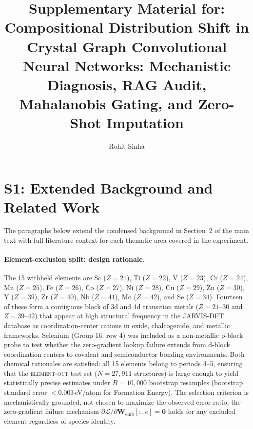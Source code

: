 \documentclass[preprint,12pt]{elsarticle}
\newcommand{\mae}{\text{MAE}}
\newcommand{\elout}{\textsc{element-out}}
\begin{document}
\begin{frontmatter}
\title{Supplementary Material for: Compositional Distribution Shift in Crystal Graph Convolutional Neural Networks: Mechanistic Diagnosis, RAG Audit, Mahalanobis Gating, and Zero-Shot Imputation}

\author[inst1]{Rohit Sinha}
\address[inst1]{Government Engineering College Jagdalpur, Jagdalpur, Chhattisgarh, 494005, India}
\end{frontmatter}


\section*{S1: Extended Background and Related Work}
\label{supp:s1}

The paragraphs below extend the condensed background in Section~2 of the
main text with full literature context for each thematic area covered in the
experiment.

\paragraph{Element-exclusion split: design rationale.}
The 15 withheld elements are
Sc ($Z=21$), Ti ($Z=22$), V ($Z=23$), Cr ($Z=24$), Mn ($Z=25$),
Fe ($Z=26$), Co ($Z=27$), Ni ($Z=28$), Cu ($Z=29$), Zn ($Z=30$),
Y ($Z=39$), Zr ($Z=40$), Nb ($Z=41$), Mo ($Z=42$), and Se ($Z=34$).
Fourteen of these form a contiguous block of 3d and 4d transition metals
($Z=21$--$30$ and $Z=39$--$42$) that appear at high structural frequency
in the JARVIS-DFT database as coordination-center cations in oxide,
chalcogenide, and metallic frameworks. Selenium (Group 16, row 4) was
included as a non-metallic p-block probe to test whether the zero-gradient
lookup failure extends from d-block coordination centers to covalent and
semiconductor bonding environments. Both chemical rationales are satisfied:
all 15 elements belong to periods 4--5, ensuring that the \elout{} test
set ($N=27{,}911$ structures) is large enough to yield statistically
precise \mae{} estimates under $B=10{,}000$ bootstrap resamples
(bootstrap standard error $< 0.003$\,eV/atom for Formation Energy).
The selection criterion is mechanistically grounded, not chosen to maximize
the observed error ratio; the zero-gradient failure mechanism
$\partial\mathcal{L}/\partial\bm{W}_{\text{emb}}[:,e]=\mathbf{0}$
holds for any excluded element regardless of species identity.
\end{document}
